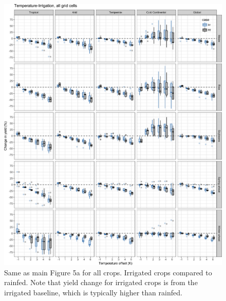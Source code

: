 \documentclass[10pt]{article}
\begin{document}
\begin{figure}[h!]
    \centering
    \includegraphics[width=\textwidth]{s_sim_CG_T_irr.png}
    \caption{Same as main Figure 5a for all crops. Irrigated crops compared to rainfed. Note that yield change for irrigated crops is from the irrigated baseline, which is typically higher than rainfed.}
    \label{fig:temp_irr}
\end{figure}
\end{document}
